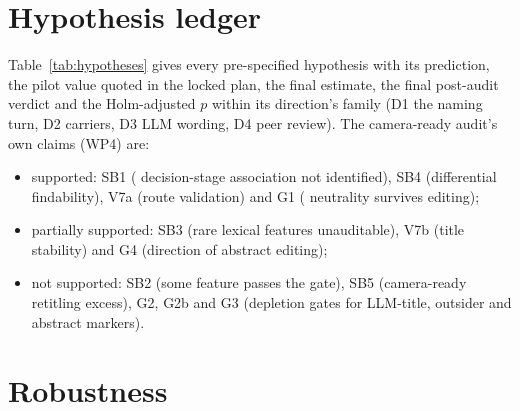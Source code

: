 
\section{Hypothesis ledger}
\label{app:nt-ledger}

Table~\ref{tab:hypotheses} gives every pre-specified hypothesis with its prediction, the pilot value quoted in the locked plan, the final estimate, the final post-audit verdict and the Holm-adjusted $p$ within its direction's family (D1 the naming turn, D2 carriers, D3 LLM wording, D4 peer review). The camera-ready audit's own claims (WP4) are:
\begin{itemize}
\item supported: SB1 (\NAME{} decision-stage association not identified), SB4 (differential findability), V7a (route validation) and G1 (\NAME{} neutrality survives editing);
\item partially supported: SB3 (rare lexical features unauditable), V7b (title stability) and G4 (direction of abstract editing);
\item not supported: SB2 (some feature passes the gate), SB5 (camera-ready retitling excess), G2, G2b and G3 (depletion gates for LLM-title, outsider and abstract markers).
\end{itemize}



\clearpage
\section{Robustness}
\label{app:nt-robust}

